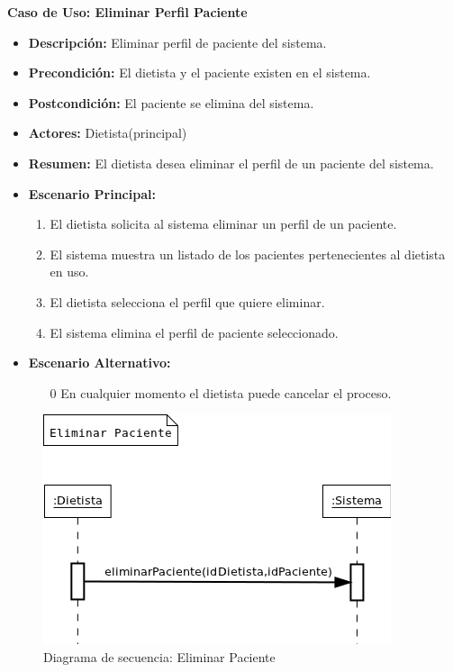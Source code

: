 \textbf{Caso de Uso: Eliminar Perfil Paciente}
\begin{itemize}
\item \textbf{Descripción:} Eliminar perfil de paciente del sistema.
\item \textbf{Precondición:} El dietista y el paciente existen en el sistema.
\item \textbf{Postcondición:} El paciente se elimina del sistema.
\item \textbf{Actores:} Dietista(principal)
\item \textbf{Resumen:} El dietista desea eliminar el perfil de un paciente del sistema.
\item \textbf{Escenario Principal:}
\begin{enumerate}
\item El dietista solicita al sistema eliminar un perfil de un paciente.
\item El sistema muestra un listado de los pacientes pertenecientes al dietista en uso.
\item El dietista selecciona el perfil que quiere eliminar.
\item El sistema elimina el perfil de paciente seleccionado.
\end{enumerate}
\item \textbf{Escenario Alternativo:}
\begin{enumerate}
\item[0] En cualquier momento el dietista puede cancelar el proceso.
\end{enumerate}
\end{itemize}
\begin{figure}[H]
  \label{ds_eliminarpaciente}
  \begin{center}
    \includegraphics[scale=0.7]{../img/DS_EliminarPaciente.png}
  \end{center}
  \caption{Diagrama de secuencia: Eliminar Paciente}
\end{figure}
